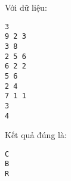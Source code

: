 Với dữ liệu:  
\begin{verbatim}
3
9 2 3
3 8
2 5 6
6 2 2
5 6
2 4
7 1 1
3
4
\end{verbatim}

   Kết quả đúng là:  
\begin{verbatim}
C
B
R
\end{verbatim}